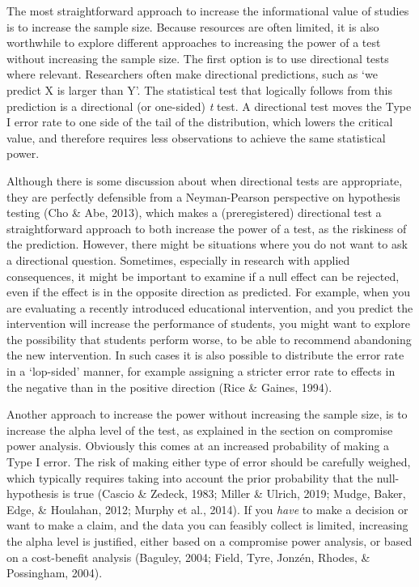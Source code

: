 \documentclass[
  english,
  ,jou, a4paper,floatsintext]{apa6}
\begin{document}
The most straightforward approach to increase the informational value of studies is to increase the sample size. Because resources are often limited, it is also worthwhile to explore different approaches to increasing the power of a test without increasing the sample size. The first option is to use directional tests where relevant. Researchers often make directional predictions, such as `we predict X is larger than Y'. The statistical test that logically follows from this prediction is a directional (or one-sided) \emph{t} test. A directional test moves the Type I error rate to one side of the tail of the distribution, which lowers the critical value, and therefore requires less observations to achieve the same statistical power.

Although there is some discussion about when directional tests are appropriate, they are perfectly defensible from a Neyman-Pearson perspective on hypothesis testing (Cho \& Abe, 2013), which makes a (preregistered) directional test a straightforward approach to both increase the power of a test, as the riskiness of the prediction. However, there might be situations where you do not want to ask a directional question. Sometimes, especially in research with applied consequences, it might be important to examine if a null effect can be rejected, even if the effect is in the opposite direction as predicted. For example, when you are evaluating a recently introduced educational intervention, and you predict the intervention will increase the performance of students, you might want to explore the possibility that students perform worse, to be able to recommend abandoning the new intervention. In such cases it is also possible to distribute the error rate in a `lop-sided' manner, for example assigning a stricter error rate to effects in the negative than in the positive direction (Rice \& Gaines, 1994).

Another approach to increase the power without increasing the sample size, is to increase the alpha level of the test, as explained in the section on compromise power analysis. Obviously this comes at an increased probability of making a Type I error. The risk of making either type of error should be carefully weighed, which typically requires taking into account the prior probability that the null-hypothesis is true (Cascio \& Zedeck, 1983; Miller \& Ulrich, 2019; Mudge, Baker, Edge, \& Houlahan, 2012; Murphy et al., 2014). If you \emph{have} to make a decision or want to make a claim, and the data you can feasibly collect is limited, increasing the alpha level is justified, either based on a compromise power analysis, or based on a cost-benefit analysis (Baguley, 2004; Field, Tyre, Jonzén, Rhodes, \& Possingham, 2004).
\end{document}
